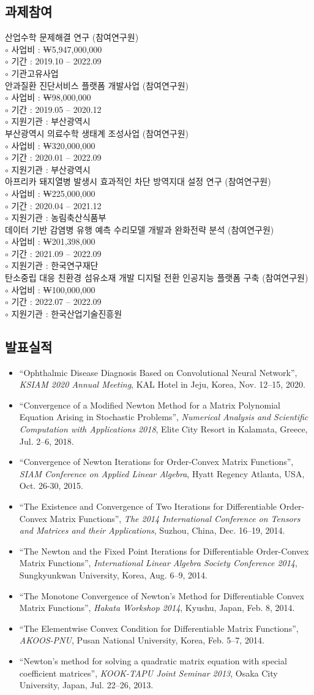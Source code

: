 \documentclass[11pt]{article} %
\newcommand\myprojs{
	산업수학 문제해결 연구 (참여연구원) \\
	$\circ$ 사업비 : ₩5,947,000,000 \\
	$\circ$ 기간 : 2019.10 -- 2022.09 \\
	$\circ$ 기관고유사업 \\
	
	안과질환 진단서비스 플랫폼 개발사업 (참여연구원) \\
	$\circ$ 사업비 : ₩98,000,000 \\
	$\circ$ 기간 : 2019.05 -- 2020.12 \\
	$\circ$ 지원기관 : 부산광역시 \\
	
	부산광역시 의료수학 생태계 조성사업 (참여연구원) \\
	$\circ$ 사업비 : ₩320,000,000 \\
	$\circ$ 기간 : 2020.01 -- 2022.09 \\
	$\circ$ 지원기관 : 부산광역시 \\
	
	아프리카 돼지열병 발생시 효과적인 차단 방역지대 설정 연구 (참여연구원) \\
	$\circ$ 사업비 : ₩225,000,000 \\
	$\circ$ 기간 : 2020.04 -- 2021.12 \\
	$\circ$ 지원기관 : 농림축산식품부 \\
	
	데이터 기반 감염병 유행 예측 수리모델 개발과 완화전략 분석 (참여연구원) \\
	$\circ$ 사업비 : ₩201,398,000 \\
	$\circ$ 기간 : 2021.09 -- 2022.09 \\
	$\circ$ 지원기관 : 한국연구재단 \\
	
	탄소중립 대응 친환경 섬유소재 개발 디지털 전환 인공지능 플랫폼 구축 (참여연구원) \\
	$\circ$ 사업비 : ₩100,000,000 \\
	$\circ$ 기간 : 2022.07 -- 2022.09 \\
	$\circ$ 지원기관 : 한국산업기술진흥원
}
\begin{document}

\subsection*{과제참여}
\myprojs


\subsection*{발표실적}
\renewcommand\labelitemi{\tiny$\bullet$}
\newcommand\mypresent{
	\begin{itemize}[leftmargin=*]
		\item ``Ophthalmic Disease Diagnosis Based on Convolutional Neural Network'', {\it KSIAM 2020 Annual Meeting}, KAL Hotel in Jeju, Korea, Nov. 12--15, 2020.
		\item ``Convergence of a Modified Newton Method for a Matrix Polynomial Equation Arising in Stochastic Problems'', {\it Numerical Analysis and Scientific Computation with Applications 2018}, Elite City Resort in Kalamata, Greece, Jul. 2--6, 2018.
		\item ``Convergence of Newton Iterations for Order-Convex Matrix Functions'', {\it SIAM Conference on Applied Linear Algebra}, Hyatt Regency Atlanta, USA, Oct. 26-30, 2015.
		\item ``The Existence and Convergence of Two Iterations for Differentiable Order-Convex Matrix Functions'', {\it The 2014 International Conference on Tensors and Matrices and their Applications}, Suzhou, China, Dec. 16--19, 2014.
		\item ``The Newton and the Fixed Point Iterations for Differentiable Order-Convex Matrix Functions'', {\it International Linear Algebra Society Conference 2014}, Sungkyunkwan University, Korea, Aug. 6--9, 2014.
		\item ``The Monotone Convergence of Newton’s Method for Differentiable Convex Matrix Functions'', {\it Hakata Workshop 2014}, Kyushu, Japan, Feb. 8, 2014.
		\item ``The Elementwise Convex Condition for Differentiable Matrix Functions'', {\it AKOOS-PNU}, Pusan National University, Korea, Feb. 5--7, 2014.
		\item ``Newton’s method for solving a quadratic matrix equation with special coefficient matrices'', {\it KOOK-TAPU Joint Seminar 2013}, Osaka City University, Japan, Jul. 22--26, 2013.
		
	\end{itemize}
}
\mypresent
\end{document}

